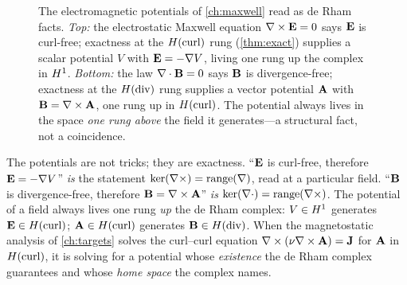 \begin{figure}[t]
\centering
{}
\caption[Potentials are exactness]{The electromagnetic potentials of
\cref{ch:maxwell} read as de Rham facts. \emph{Top:} the electrostatic Maxwell
equation $\nabla\times\mathbf{E}=0$ says $\mathbf{E}$ is curl-free; exactness at the $H(\mathrm{curl})$ rung
(\cref{thm:exact}) supplies a scalar potential $V$ with $\mathbf{E}=-\nabla V$, living one
rung up the complex in $H^1$. \emph{Bottom:} the law $\nabla\cdot\mathbf{B}=0$ says $\mathbf{B}$ is
divergence-free; exactness at the $H(\mathrm{div})$ rung supplies a vector potential $\mathbf{A}$ with
$\mathbf{B}=\nabla\times\mathbf{A}$, one rung up in $H(\mathrm{curl})$. The potential always lives in the space
\emph{one rung above} the field it generates---a structural fact, not a coincidence.}
\label{fig:potentials}
\end{figure}

\begin{keyidea}
The potentials are not tricks; they are exactness. ``$\mathbf{E}$ is curl-free, therefore
$\mathbf{E}=-\nabla V$'' \emph{is} the statement $\ker(\nabla\times)=\operatorname{range}(\nabla)$,
read at a particular field. ``$\mathbf{B}$ is divergence-free, therefore $\mathbf{B}=\nabla\times\mathbf{A}$''
\emph{is} $\ker(\nabla\cdot)=\operatorname{range}(\nabla\times)$. The potential of a field always
lives one rung \emph{up} the de Rham complex: $V\in H^1$ generates $\mathbf{E}\in H(\mathrm{curl})$;
$\mathbf{A}\in H(\mathrm{curl})$ generates $\mathbf{B}\in H(\mathrm{div})$. When the magnetostatic analysis of
\cref{ch:targets} solves the curl--curl equation $\nabla\times(\nu\nabla\times\mathbf{A})=\mathbf{J}$ for $\mathbf{A}$
in $H(\mathrm{curl})$, it is solving for a potential whose \emph{existence} the de Rham complex
guarantees and whose \emph{home space} the complex names.
\end{keyidea}

